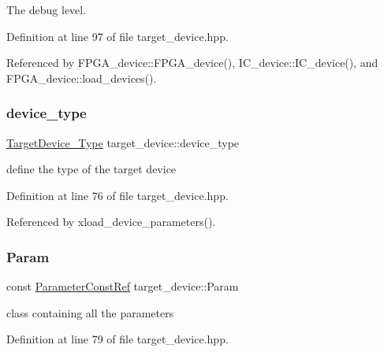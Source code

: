 The debug level. 



Definition at line 97 of file target\+\_\+device.\+hpp.



Referenced by F\+P\+G\+A\+\_\+device\+::\+F\+P\+G\+A\+\_\+device(), I\+C\+\_\+device\+::\+I\+C\+\_\+device(), and F\+P\+G\+A\+\_\+device\+::load\+\_\+devices().

\mbox{\label{classtarget__device_aacaa16bc02d3ee7265cf8fc11c6d4863}} 
\subsubsection{\texorpdfstring{device\+\_\+type}{device\_type}}
{\footnotesize\ttfamily \hyperlink{target__device_8hpp_a476becc690220f0805ce73006449c732}{Target\+Device\+\_\+\+Type} target\+\_\+device\+::device\+\_\+type\hspace{0.3cm}{\ttfamily [protected]}}



define the type of the target device 



Definition at line 76 of file target\+\_\+device.\+hpp.



Referenced by xload\+\_\+device\+\_\+parameters().

\mbox{\label{classtarget__device_a2ab6118c487cc65cf7fe3462c96967ec}} 
\subsubsection{\texorpdfstring{Param}{Param}}
{\footnotesize\ttfamily const \hyperlink{Parameter_8hpp_a37841774a6fcb479b597fdf8955eb4ea}{Parameter\+Const\+Ref} target\+\_\+device\+::\+Param\hspace{0.3cm}{\ttfamily [protected]}}



class containing all the parameters 



Definition at line 79 of file target\+\_\+device.\+hpp.



